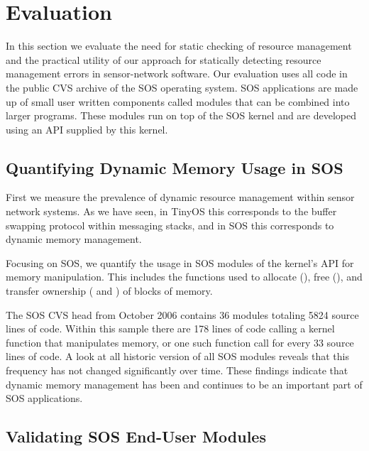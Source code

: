 \section{Evaluation}
\label{sec:eval}



In this section we evaluate the need for static checking of resource
management and the practical utility of our approach for statically
detecting resource management errors in sensor-network software.  
%
Our evaluation uses all code in the public CVS archive of the SOS
operating system.
%
SOS applications are made up of small user written components called
modules that can be combined into larger programs.  
%
These modules run on top of the SOS kernel and are developed using an
API supplied by this kernel.



\subsection{Quantifying Dynamic Memory Usage in SOS}



First we measure the prevalence of dynamic resource management within
sensor network systems.  
%
As we have seen, in TinyOS this corresponds to the buffer swapping
protocol within messaging stacks, and in SOS this corresponds to dynamic
memory management.



Focusing on SOS, we quantify the usage in SOS modules of the kernel's
API for memory manipulation.
%
This includes the functions used to allocate (), free
(), and transfer ownership ( and
) of blocks of memory.



The SOS CVS head from October 2006 contains 36 modules totaling 5824 source 
lines of code.  
%
Within this sample there are 178 lines of code
calling a kernel function that manipulates memory, or one such function call
for every 33 source lines of code.  
%
A look at all historic version of all
SOS modules reveals that this frequency has not changed significantly
over time.  
%
These findings indicate that dynamic memory management has been
and continues to be an important part of SOS applications.



\subsection{Validating SOS End-User Modules}



